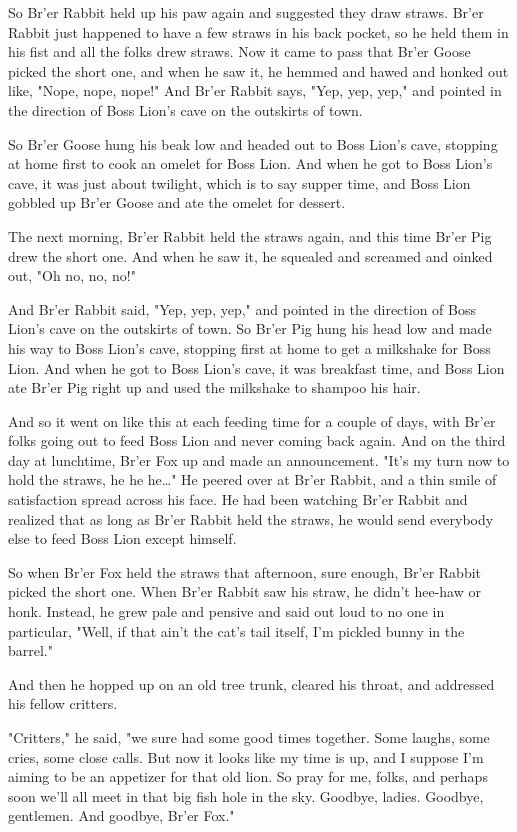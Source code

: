 So Br'er Rabbit held up his paw again and suggested they draw straws. Br'er Rabbit just happened to have a few straws in his back pocket, so he held them in his fist and all the folks drew straws. Now it came to pass that Br'er Goose picked the short one, and when he saw it, he hemmed and hawed and honked out like, "Nope, nope, nope!" And Br'er Rabbit says, "Yep, yep, yep," and pointed in the direction of Boss Lion's cave on the outskirts of town.

So Br'er Goose hung his beak low and headed out to Boss Lion's cave, stopping at home first to cook an omelet for Boss Lion. And when he got to Boss Lion's cave, it was just about twilight, which is to say supper time, and Boss Lion gobbled up Br'er Goose and ate the omelet for dessert.

The next morning, Br'er Rabbit held the straws again, and this time Br'er Pig drew the short one. And when he saw it, he squealed and screamed and oinked out, "Oh no, no, no!"

And Br'er Rabbit said, "Yep, yep, yep," and pointed in the direction of Boss Lion's cave on the outskirts of town. So Br'er Pig hung his head low and made his way to Boss Lion's cave, stopping first at home to get a milkshake for Boss Lion. And when he got to Boss Lion's cave, it was breakfast time, and Boss Lion ate Br'er Pig right up and used the milkshake to shampoo his hair.

And so it went on like this at each feeding time for a couple of days, with Br'er folks going out to feed Boss Lion and never coming back again. And on the third day at lunchtime, Br'er Fox up and made an announcement. "It's my turn now to hold the straws, he he he\dots" He peered over at Br'er Rabbit, and a thin smile of satisfaction spread across his face. He had been watching Br'er Rabbit and realized that as long as Br'er Rabbit held the straws, he would send everybody else to feed Boss Lion except himself.

So when Br'er Fox held the straws that afternoon, sure enough, Br'er Rabbit picked the short one. When Br'er Rabbit saw his straw, he didn't hee-haw or honk. Instead, he grew pale and pensive and said out loud to no one in particular, "Well, if that ain't the cat's tail itself, I'm pickled bunny in the barrel."

And then he hopped up on an old tree trunk, cleared his throat, and addressed his fellow critters.

"Critters," he said, "we sure had some good times together. Some laughs, some cries, some close calls. But now it looks like my time is up, and I suppose I'm aiming to be an appetizer for that old lion. So pray for me, folks, and perhaps soon we'll all meet in that big fish hole in the sky. Goodbye, ladies. Goodbye, gentlemen. And goodbye, Br'er Fox."

